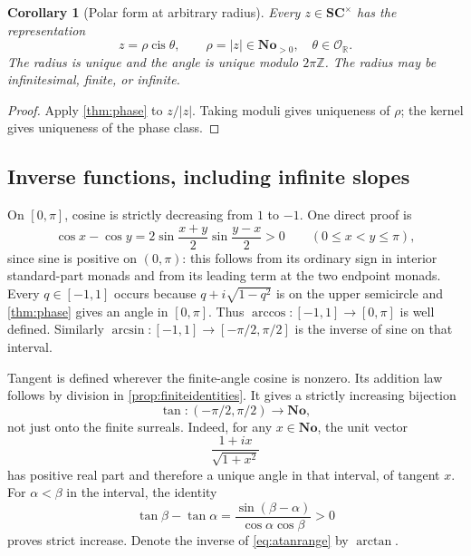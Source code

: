 \documentclass[11pt,letterpaper]{article}
\newtheorem{corollary}[theorem]{Corollary}
\theoremstyle{definition}
\theoremstyle{remark}
\newcommand{\No}{\mathbf{No}}
\newcommand{\SC}{\mathbf{SC}}
\newcommand{\R}{\mathbb R}\newcommand{\C}{\mathbb C}
\newcommand{\Z}{\mathbb Z}\newcommand{\N}{\mathbb N}
\newcommand{\OO}{\mathcal O}\newcommand{\mm}{\mathfrak m}
\newcommand{\cis}{\operatorname{cis}}
\numberwithin{equation}{section}
\begin{document}
\begin{corollary}[Polar form at arbitrary radius]\label{cor:polar}
Every $z\in\SC^\times$ has the representation
\[
 z=\rho\cis\theta,\qquad \rho=|z|\in\No_{>0},\quad\theta\in\OO_{\R}.
\]
The radius is unique and the angle is unique modulo $2\pi\Z$. The radius may be infinitesimal, finite, or infinite.
\end{corollary}
\begin{proof}
Apply \cref{thm:phase} to $z/|z|$. Taking moduli gives uniqueness of $\rho$; the kernel gives uniqueness of the phase class.
\end{proof}

\subsection{Inverse functions, including infinite slopes}
On $[0,\pi]$, cosine is strictly decreasing from $1$ to $-1$. One direct proof is
\[
 \cos x-\cos y=2\sin\frac{x+y}{2}\sin\frac{y-x}{2}>0\qquad(0\le x<y\le\pi),
\]
since sine is positive on $(0,\pi)$: this follows from its ordinary sign in interior standard-part monads and from its leading term at the two endpoint monads. Every $q\in[-1,1]$ occurs because $q+i\sqrt{1-q^2}$ is on the upper semicircle and \cref{thm:phase} gives an angle in $[0,\pi]$. Thus $\arccos:[-1,1]\to[0,\pi]$ is well defined. Similarly $\arcsin:[-1,1]\to[-\pi/2,\pi/2]$ is the inverse of sine on that interval.

Tangent is defined wherever the finite-angle cosine is nonzero. Its addition law follows by division in \cref{prop:finiteidentities}. It gives a strictly increasing bijection
\begin{equation}\label{eq:atanrange}
 \tan:(-\pi/2,\pi/2)\longrightarrow\No,
\end{equation}
not just onto the finite surreals. Indeed, for any $x\in\No$, the unit vector
\[
 \frac{1+ix}{\sqrt{1+x^2}}
\]
has positive real part and therefore a unique angle in that interval, of tangent $x$. For $\alpha<\beta$ in the interval, the identity
\[
 \tan\beta-\tan\alpha=\frac{\sin(\beta-\alpha)}{\cos\alpha\cos\beta}>0
\]
proves strict increase. Denote the inverse of \eqref{eq:atanrange} by $\arctan$.
\end{document}
